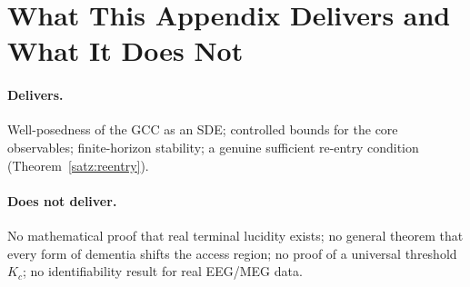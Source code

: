 \documentclass[11pt]{article}
\theoremstyle{plain}
\theoremstyle{definition}
\theoremstyle{remark}
\begin{document}
\section{What This Appendix Delivers and What It Does Not}

\paragraph{Delivers.}
Well-posedness of the GCC as an SDE; controlled bounds for the core observables; finite-horizon stability; a genuine sufficient re-entry condition (Theorem~\ref{satz:reentry}).

\paragraph{Does not deliver.}
No mathematical proof that real terminal lucidity exists; no general theorem that every form of dementia shifts the access region; no proof of a universal threshold $K_c$; no identifiability result for real EEG/MEG data.


\end{document}
